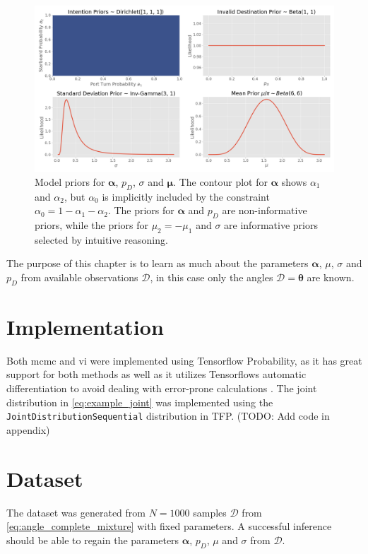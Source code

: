 \begin{figure}
    \centering
    \includegraphics[width=1\textwidth]{figures/priors.png}
    \caption{Model priors for $\boldsymbol{\alpha}$, $p_D$, $\sigma$ and $\boldsymbol{\mu}$. The contour plot for $\boldsymbol{\alpha}$ shows $\alpha_1$ and $\alpha_2$, but $\alpha_0$ is implicitly included by the constraint $\alpha_0 = 1 - \alpha_1 - \alpha_2$. The priors for $\boldsymbol{\alpha}$ and $p_D$ are non-informative priors, while the priors for $\mu_2 = -\mu_1$ and $\sigma$ are informative priors selected by intuitive reasoning.}
    \label{fig:priors}
\end{figure}

The purpose of this chapter is to learn as much about the parameters $\boldsymbol{\alpha}$, $\mu$, $\sigma$ and $p_D$ from available observations $\mathcal{D}$, in this case only the angles $\mathcal{D} = \boldsymbol{\theta}$ are known. 

\section{Implementation}
Both \acrshort{mcmc} and \acrshort{vi} were implemented using Tensorflow Probability, as it has great support for both methods as well as it utilizes Tensorflows automatic differentiation to avoid dealing with error-prone calculations \cite{tensorflow2015-whitepaper}. The joint distribution in \cref{eq:example_joint} was implemented using the \texttt{JointDistributionSequential} distribution in TFP. (TODO: Add code in appendix)


\section{Dataset}
The dataset was generated from $N=1000$ samples $\mathcal{D}$ from \cref{eq:angle_complete_mixture} with fixed parameters. A successful inference should be able to regain the parameters $\boldsymbol{\alpha}$, $p_D$, $\mu$ and $\sigma$ from $\mathcal{D}$.

